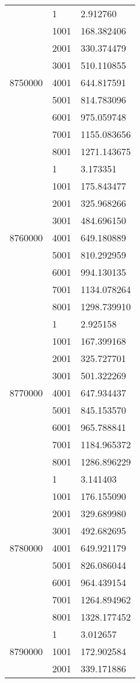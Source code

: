 \begin{table}[htb!]
\begin{tabular}{lll}
\multirow[c]{9}{*}{8750000} & 1 & 2.912760 \\
 & 1001 & 168.382406 \\
 & 2001 & 330.374479 \\
 & 3001 & 510.110855 \\
 & 4001 & 644.817591 \\
 & 5001 & 814.783096 \\
 & 6001 & 975.059748 \\
 & 7001 & 1155.083656 \\
 & 8001 & 1271.143675 \\
\multirow[c]{9}{*}{8760000} & 1 & 3.173351 \\
 & 1001 & 175.843477 \\
 & 2001 & 325.968266 \\
 & 3001 & 484.696150 \\
 & 4001 & 649.180889 \\
 & 5001 & 810.292959 \\
 & 6001 & 994.130135 \\
 & 7001 & 1134.078264 \\
 & 8001 & 1298.739910 \\
\multirow[c]{9}{*}{8770000} & 1 & 2.925158 \\
 & 1001 & 167.399168 \\
 & 2001 & 325.727701 \\
 & 3001 & 501.322269 \\
 & 4001 & 647.934437 \\
 & 5001 & 845.153570 \\
 & 6001 & 965.788841 \\
 & 7001 & 1184.965372 \\
 & 8001 & 1286.896229 \\
\multirow[c]{9}{*}{8780000} & 1 & 3.141403 \\
 & 1001 & 176.155090 \\
 & 2001 & 329.689980 \\
 & 3001 & 492.682695 \\
 & 4001 & 649.921179 \\
 & 5001 & 826.086044 \\
 & 6001 & 964.439154 \\
 & 7001 & 1264.894962 \\
 & 8001 & 1328.177452 \\
\multirow[c]{9}{*}{8790000} & 1 & 3.012657 \\
 & 1001 & 172.902584 \\
 & 2001 & 339.171886 \\

\end{tabular}
\end{table}

